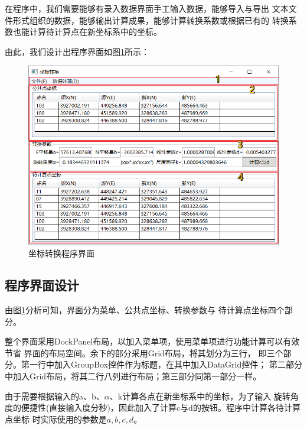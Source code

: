 在程序中，我们需要能够有录入数据界面手工输入数据，能够导入与导出
文本文件形式组织的数据，能够输出计算成果，能够计算转换系数或根据已有的
转换系数也能计算待计算点在新坐标系中的坐标。

由此，我们设计出程序界面如图\ref{fig:XYtoXYUI02}所示：

\begin{figure}[htbp]
    \centering
    \includegraphics[scale=1]{chapter/xytoxy/XYtoXYUI02.png}
    \caption{坐标转换程序界面}
    \label{fig:XYtoXYUI02}
\end{figure}

\subsection{程序界面设计}

由图\ref{fig:XYtoXYUI02}分析可知，界面分为菜单、公共点坐标、转换参数与
待计算点坐标四个部分。

整个界面采用DockPanel布局，以加入菜单项，使用菜单项进行功能计算可以有效节省
界面的布局空间。余下的部分采用Grid布局，将其划分为三行，
即三个部分。第一行中加入GroupBox控件作为标题，在其中加入DataGrid控件；
第二部分中加入Grid布局，将其二行八列进行布局；第三部分同第一部分一样。

由于需要根据输入的a、b、$\alpha$、k计算各点在新坐标系中的坐标，为了输入
旋转角度的便捷性(直接输入度分秒)，因此加入了计算c与d的按钮。程序中计算各待计算点坐标
时实际使用的参数是$a,b,c,d$。


